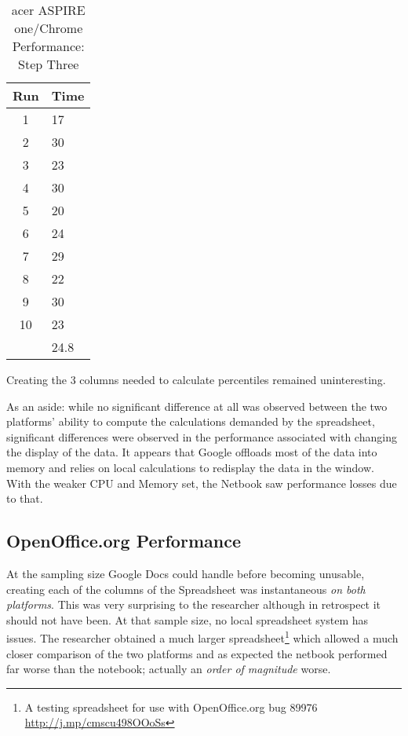 \begin{table}
  \begin{tabular}{| c | l |}
    \hline
    Run  & Time \\ \hline
    1    & 17   \\ \hline
    2    & 30   \\ \hline
    3    & 23   \\ \hline
    4    & 30   \\ \hline
    5    & 20   \\ \hline
    6    & 24   \\ \hline
    7    & 29   \\ \hline
    8    & 22   \\ \hline
    9    & 30   \\ \hline
    10   & 23   \\ \hline
    & 24.8 \\
    \hline
  \end{tabular}
  \caption{acer ASPIRE one/Chrome Performance: Step Three}
  \label{aspChrPerf03}
\end{table}

Creating the 3 columns needed to calculate percentiles remained uninteresting.

As an aside: while no significant difference at all was observed between the
two platforms' ability to compute the calculations demanded by the spreadsheet,
significant differences were observed in the performance associated with
changing the display of the data.  It appears that Google offloads most of the
data into memory and relies on local calculations to redisplay the data in the
window.  With the weaker CPU and Memory set, the Netbook saw performance losses
due to that.

\subsection{OpenOffice.org Performance}

At the sampling size Google Docs could handle before becoming unusable, creating
each of the columns of the Spreadsheet was instantaneous \emph{on both
  platforms}.  This was very surprising to the researcher although in retrospect
it should not have been.  At that sample size, no local spreadsheet system has
issues.  The researcher obtained a much larger spreadsheet\footnote{A testing
  spreadsheet for use with OpenOffice.org bug 89976
  \url{http://j.mp/cmscu498OOoSs}} which allowed a much closer comparison of the
two platforms and as expected the netbook performed far worse than the notebook;
actually an \emph{order of magnitude} worse.

